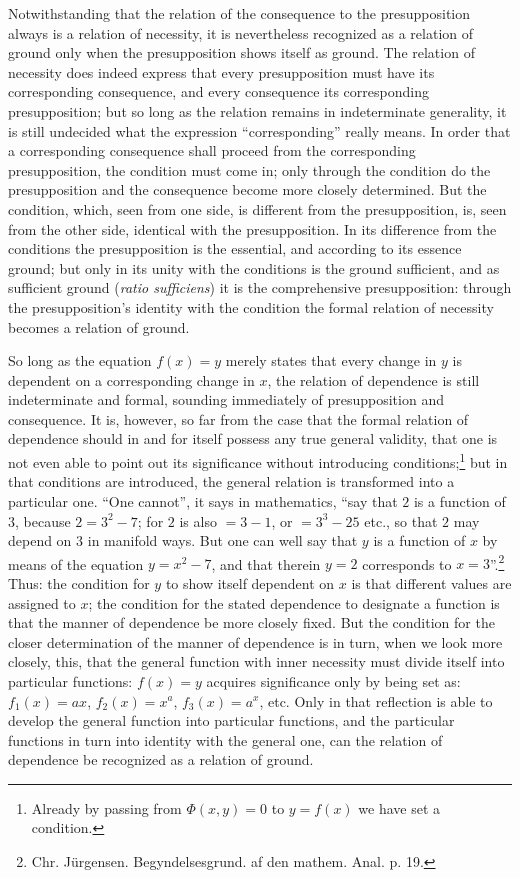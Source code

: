 \documentclass[12pt,a4paper,openany]{book}
\newcommand{\opage}[1]{\marginnote{\footnotesize\textit{[#1]}}}
\begin{document}
Notwithstanding that the relation of the consequence to the presupposition always
is a relation of necessity, it is nevertheless recognized as a
relation of ground only when the presupposition shows itself as ground.
The relation of necessity does indeed express that every presupposition
must have its corresponding consequence, and every consequence
its corresponding presupposition; but so long as the relation
remains in indeterminate generality, it is still
undecided what the expression ``corresponding'' really means. In order
that a corresponding consequence shall proceed from the corresponding
presupposition, the condition must come in; only through the condition
do the presupposition and the consequence become more closely determined.
\setcounter{footnote}{0}%
\opage{10}But the condition, which, seen from one side, is different
from the presupposition, is, seen from the other side, identical
with the presupposition. In its difference from the conditions
the presupposition is the essential, and according to its essence ground;
but only in its unity with the conditions is the ground sufficient,
and as sufficient ground (\textit{ratio sufficiens}) it is
the comprehensive presupposition: through the presupposition's identity
with the condition the formal relation of necessity becomes a
relation of ground.

So long as the equation $f(x)=y$ merely states that every
change in $y$ is dependent on a corresponding change in $x$, the relation of dependence is still indeterminate and formal,
sounding immediately of presupposition and consequence. It
is, however, so far from the case that the formal relation of dependence
should in and for itself possess any true general validity,
that one is not even able to point out its significance
without introducing conditions;\footnote[1]{Already by passing from $\Phi(x, y)=0$ to $y=f(x)$ we have set a condition.} but in that conditions are introduced,
the general relation is transformed into a particular one. ``One
cannot'', it says in mathematics, ``say that $2$ is a
function of $3$, because $2=3^{2}-7$; for $2$ is also $= 3-1$, or $= 3^{3}-25$ etc., so that $2$ may depend on $3$ in
manifold ways. But one can well say that
$y$ is a function of $x$ by means of the equation $y=x^{2}-7$, and
that therein $y=2$ corresponds to $x=3$''.\footnote[2]{Chr. Jürgensen. Begyndelsesgrund. af den mathem. Anal. p. 19.} Thus: the condition for
$y$ to show itself dependent on $x$ is that different values are assigned to $x$; the condition for the stated dependence
to designate a function is that the manner of dependence
be more closely fixed. But the condition for the closer
determination of the manner of dependence is in turn, when we
look more closely, this, that the general function with inner
\setcounter{footnote}{0}%
\opage{11}necessity must divide itself into particular functions: $f(x)=y$ acquires significance only by being set as: $f_{1}(x)=ax$, $f_{2}(x)=x^{a}$,
$f_{3}(x)=a^{x}$, etc. Only in that reflection is able
to develop the general function into particular functions,
and the particular functions in turn into identity with the
general one, can the relation of dependence be recognized as a relation of ground.
\end{document}
